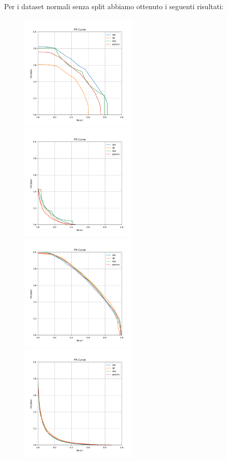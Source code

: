 Per i dataset normali senza split abbiamo ottenuto i seguenti risultati:

\begin{figure}[h!]
    \includegraphics[width=0.5\textwidth]{../images/toyexperiments/prcurves/PRCurve_nosplit_k4_s1.png}
    \includegraphics[width=0.5\textwidth]{../images/toyexperiments/prcurves/PRCurve_nosplit_k4_s3.png}
    \includegraphics[width=0.5\textwidth]{../images/toyexperiments/prcurves/PRCurve_nosplit_ksqrt_s1.png}
    \includegraphics[width=0.5\textwidth]{../images/toyexperiments/prcurves/PRCurve_nosplit_ksqrt_s3.png}
\end{figure}

